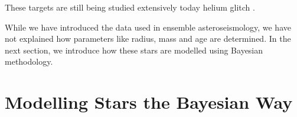These targets are still being studied extensively today helium glitch \citet{Mazumdar.Monteiro.ea2014,Verma.Raodeo.ea2019}.

While we have introduced the data used in ensemble asteroseismology, we have not explained how parameters like radius, mass and age are determined. In the next section, we introduce how these stars are modelled using Bayesian methodology.


\section{Modelling Stars the Bayesian Way}\label{sec:modelling-stars}





